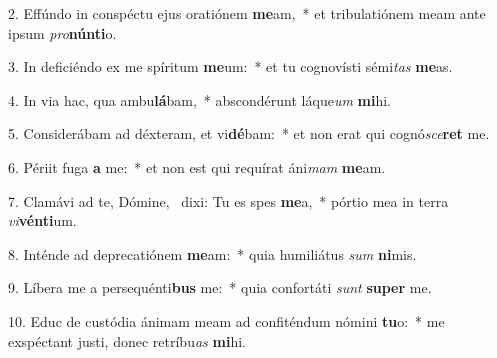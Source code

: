 2. Effúndo in conspéctu ejus oratiónem \textbf{me}am,~*  et tribulatiónem meam ante ipsum \textit{pro}\textbf{nún}\textbf{ti}o.\

3. In deficiéndo ex me spíritum \textbf{me}um:~*  et tu cognovísti sémi\textit{tas} \textbf{me}as.\

4. In via hac, qua ambu\textbf{lá}bam,~*  abscondérunt láque\textit{um} \textbf{mi}hi.\

5. Considerábam ad déxteram, et vi\textbf{dé}bam:~*  et non erat qui cognó\textit{sce}\textbf{ret} me.\

6. Périit fuga \textbf{a} me:~*  et non est qui requírat áni\textit{mam} \textbf{me}am.\

7. Clamávi ad te, Dómine, \dag\  dixi: Tu es spes \textbf{me}a,~*  pórtio mea in terra \textit{vi}\textbf{vén}\textbf{ti}um.\

8. Inténde ad deprecatiónem \textbf{me}am:~*  quia humiliátus \textit{sum} \textbf{ni}mis.\

9. Líbera me a persequénti\textbf{bus} me:~*  quia confortáti \textit{sunt} \textbf{su}\textbf{per} me.\

10. Educ de custódia ánimam meam ad confiténdum nómini \textbf{tu}o:~*  me exspéctant justi, donec retríbu\textit{as} \textbf{mi}hi.\

